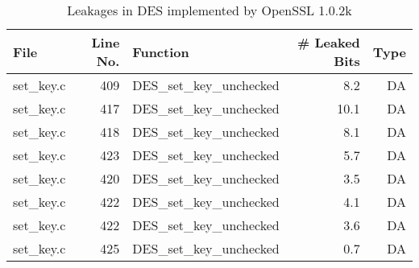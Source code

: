 \begin{table}[h!]
\centering\tiny\scriptsize
\caption{Leakages in DES implemented by OpenSSL 1.0.2k}\label{tab:DESOpenSSL1.0.2k}
\begin{tabular}{lrlrr}
\hline
\textbf{File} & \textbf{Line No.} & \textbf{Function} & \textbf{\# Leaked Bits} & \textbf{Type} \\\hline
set\_key.c& 409&DES\_set\_key\_unchecked&8.2 &DA\\
set\_key.c& 417&DES\_set\_key\_unchecked&10.1 &DA\\
set\_key.c& 418&DES\_set\_key\_unchecked&8.1 &DA\\
set\_key.c& 423&DES\_set\_key\_unchecked&5.7 &DA\\
set\_key.c& 420&DES\_set\_key\_unchecked&3.5 &DA\\
set\_key.c& 422&DES\_set\_key\_unchecked&4.1 &DA\\
set\_key.c& 422&DES\_set\_key\_unchecked&3.6 &DA\\
set\_key.c& 425&DES\_set\_key\_unchecked&0.7 &DA\\
\hline
\end{tabular}
\renewcommand{\baselinestretch}{1.0}\selectfont
\end{table}
